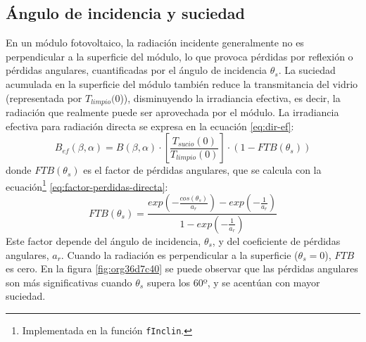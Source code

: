 \subsection{Ángulo de incidencia y suciedad}
\label{sec:orgcf9be12}
\label{subsec-angulo-incidencia-suciedad}
En un módulo fotovoltaico, la radiación incidente generalmente no es perpendicular a la superficie del módulo, lo que provoca pérdidas por reflexión o pérdidas angulares, cuantificadas por el ángulo de incidencia \(\theta_s\). La suciedad acumulada en la superficie del módulo también reduce la transmitancia del vidrio (representada por \(T_{limpio}(0\))), disminuyendo la irradiancia efectiva, es decir, la radiación que realmente puede ser aprovechada por el módulo.
La irradiancia efectiva para radiación directa se expresa en la ecuación \ref{eq:dir-ef}:
\begin{equation}
B_{ef}(\beta ,\alpha)=B(\beta ,\alpha)\cdot [\frac{T_{sucio}(0)}{T_{limpio}(0)}]\cdot (1-FTB(\theta_s))
\label{eq:dir-ef}
\end{equation}
donde \(FTB(\theta_s)\) es el factor de pérdidas angulares, que se calcula con la ecuación\footnote{Implementada en la función \texttt{fInclin}.} \ref{eq:factor-perdidas-directa}: 
\begin{equation}
FTB(\theta_s)=\frac{exp(-\frac{cos(\theta_s)}{a_r})-exp(-\frac{1}{a_r})}{1-exp(-\frac{1}{a_r})}
\label{eq:factor-perdidas-directa}
\end{equation}
Este factor depende del ángulo de incidencia, \(\theta_s\), y del coeficiente de pérdidas angulares, \(a_r\). Cuando la radiación es perpendicular a la superficie (\(\theta_s=0\)), \(FTB\) es cero. En la figura \ref{fig:org36d7c40} se puede observar que las pérdidas angulares son más significativas cuando \(\theta_s\) supera los 60º, y se acentúan con mayor suciedad.
